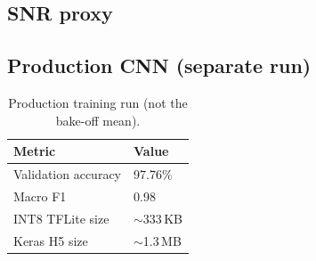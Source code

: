 \subsection{SNR proxy}

\subsection{Production CNN (separate run)}
\begin{table}[H]
\centering
\caption{Production training run (not the bake-off mean).}
\label{tab:prod}
\begin{tabular}{@{}ll@{}}
\toprule
Metric & Value \\
\midrule
Validation accuracy & 97.76\% \\
Macro F1 & 0.98 \\
INT8 TFLite size & $\sim$333\,KB \\
Keras H5 size & $\sim$1.3\,MB \\
\bottomrule
\end{tabular}
\end{table}
